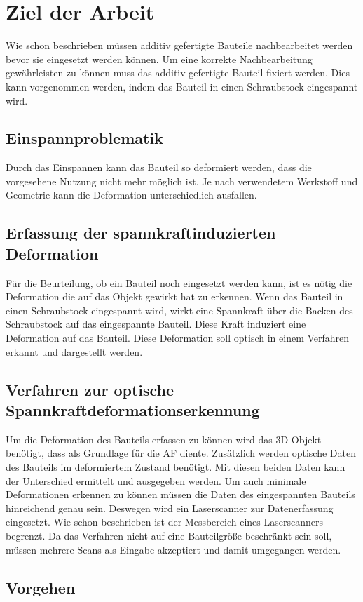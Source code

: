 

\chapter{Ziel der Arbeit}

Wie schon beschrieben müssen additiv gefertigte Bauteile nachbearbeitet werden
bevor sie eingesetzt werden können. 
Um eine korrekte Nachbearbeitung gewährleisten zu können muss das additiv 
gefertigte Bauteil fixiert werden. 
Dies kann vorgenommen werden, indem das Bauteil in einen Schraubstock eingespannt wird.

\section{Einspannproblematik}

Durch das Einspannen kann das Bauteil so deformiert werden, dass die vorgesehene Nutzung nicht mehr möglich ist. 
Je nach verwendetem Werkstoff und Geometrie kann die Deformation unterschiedlich
ausfallen. 

\section{Erfassung der spannkraftinduzierten Deformation}

Für die Beurteilung, ob ein Bauteil noch eingesetzt werden kann, ist es nötig die 
Deformation die auf das Objekt gewirkt hat zu erkennen. Wenn das Bauteil in einen 
Schraubstock eingespannt wird, wirkt eine Spannkraft über die Backen des Schraubstock
auf das eingespannte Bauteil. 
Diese Kraft induziert eine Deformation auf das Bauteil. Diese Deformation soll 
optisch in einem Verfahren erkannt und dargestellt werden.

\section{Verfahren zur optische Spannkraftdeformationserkennung}

Um die Deformation des Bauteils erfassen zu können wird das 3D-Objekt benötigt, 
dass als Grundlage für die AF diente. Zusätzlich werden optische Daten des Bauteils 
im deformiertem Zustand benötigt. Mit diesen beiden Daten kann der Unterschied 
ermittelt und ausgegeben werden.
Um auch minimale Deformationen erkennen zu können müssen die Daten des 
eingespannten Bauteils hinreichend genau sein. Deswegen wird ein Laserscanner zur 
Datenerfassung eingesetzt.
Wie schon beschrieben ist der Messbereich eines Laserscanners begrenzt. Da das 
Verfahren nicht auf eine Bauteilgröße beschränkt sein soll, müssen mehrere Scans als 
Eingabe akzeptiert und damit umgegangen werden.

\section{Vorgehen}

























